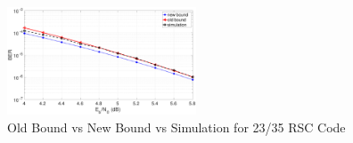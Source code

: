 \begin{figure}[h!]
\centering
		\includegraphics[width=0.5\textwidth]{./Images/RSC_23_35_lower_weights.eps}
		\caption{Old Bound vs New Bound vs Simulation for 23/35 RSC Code}
		\label{simFig3}
		\end{figure}


		
		


